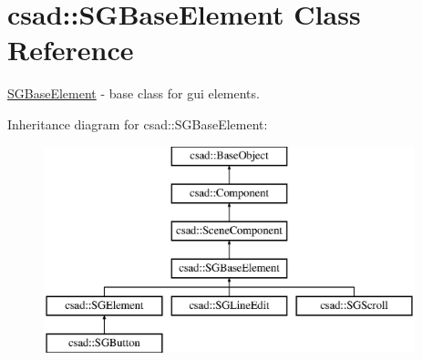 \hypertarget{classcsad_1_1_s_g_base_element}{\section{csad\-:\-:S\-G\-Base\-Element Class Reference}
\label{classcsad_1_1_s_g_base_element}
}


\hyperlink{classcsad_1_1_s_g_base_element}{S\-G\-Base\-Element} -\/ base class for gui elements.  


Inheritance diagram for csad\-:\-:S\-G\-Base\-Element\-:\begin{figure}[H]
\begin{center}
\leavevmode
\includegraphics[height=6.000000cm]{classcsad_1_1_s_g_base_element}
\end{center}
\end{figure}
